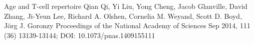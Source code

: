 \documentclass{article}
\begin{document}
\newpage
 	\begin{thebibliography}{9}
 		
 		
 		Age and T-cell repertoire
 		Qian Qi, Yi Liu, Yong Cheng, Jacob Glanville, David Zhang, Ji-Yeun Lee, Richard A. Olshen, Cornelia M. Weyand, Scott D. Boyd, Jörg J. Goronzy
 		Proceedings of the National Academy of Sciences Sep 2014, 111 (36) 13139-13144; DOI: 10.1073/pnas.1409155111
 		
 		
 
 	\end{thebibliography}
 	
 	
 	
 	
 
\end{document}
